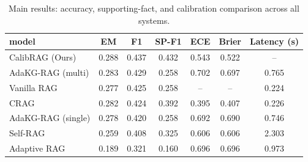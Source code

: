 \begin{table}
\caption{Main results: accuracy, supporting-fact, and calibration comparison across all systems.}
\label{tab:main_results}
\begin{tabular}{lcccccc}
\toprule
model & EM & F1 & SP-F1 & ECE & Brier & Latency (s) \\
\midrule
CalibRAG (Ours) & 0.288 & 0.437 & 0.432 & 0.543 & 0.522 & -- \\
AdaKG-RAG (multi) & 0.283 & 0.429 & 0.258 & 0.702 & 0.697 & 0.765 \\
Vanilla RAG & 0.277 & 0.425 & 0.258 & -- & -- & 0.224 \\
CRAG & 0.282 & 0.424 & 0.392 & 0.395 & 0.407 & 0.226 \\
AdaKG-RAG (single) & 0.278 & 0.420 & 0.258 & 0.692 & 0.690 & 0.746 \\
Self-RAG & 0.259 & 0.408 & 0.325 & 0.606 & 0.606 & 2.303 \\
Adaptive RAG & 0.189 & 0.321 & 0.160 & 0.696 & 0.696 & 0.973 \\
\bottomrule
\end{tabular}
\end{table}
